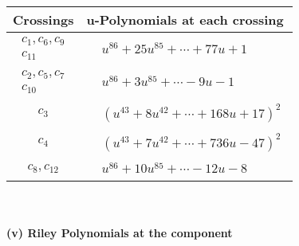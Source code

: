 \documentclass[1p]{elsarticle_modified}
\theoremstyle{definition}
\begin{document}
\begin{tabular}{m{50pt}|m{274pt}}
Crossings & \hspace{64pt}u-Polynomials at each crossing \\
\hline $$\begin{aligned}c_{1},c_{6},c_{9}\\c_{11}\end{aligned}$$&$\begin{aligned}
&u^{86}+25 u^{85}+\cdots+77 u+1
\end{aligned}$\\
\hline $$\begin{aligned}c_{2},c_{5},c_{7}\\c_{10}\end{aligned}$$&$\begin{aligned}
&u^{86}+3 u^{85}+\cdots-9 u-1
\end{aligned}$\\
\hline $$\begin{aligned}c_{3}\end{aligned}$$&$\begin{aligned}
&(u^{43}+8 u^{42}+\cdots+168 u+17)^{2}
\end{aligned}$\\
\hline $$\begin{aligned}c_{4}\end{aligned}$$&$\begin{aligned}
&(u^{43}+7 u^{42}+\cdots+736 u-47)^{2}
\end{aligned}$\\
\hline $$\begin{aligned}c_{8},c_{12}\end{aligned}$$&$\begin{aligned}
&u^{86}+10 u^{85}+\cdots-12 u-8
\end{aligned}$\\
\hline
\end{tabular}\\~\\
\newpage\renewcommand{\arraystretch}{1}
\flushleft \textbf{(v) Riley Polynomials at the component}\newline \\
\end{document}
